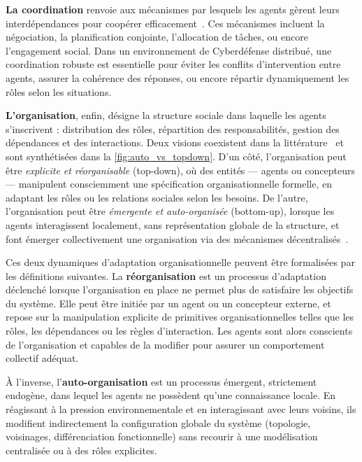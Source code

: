 \textbf{La coordination} renvoie aux mécanismes par lesquels les agents gèrent leurs interdépendances pour coopérer efficacement~\cite{Durfee2001, Jennings1996, Sandholm1999}. Ces mécanismes incluent la négociation, la planification conjointe, l'allocation de tâches, ou encore l'engagement social. Dans un environnement de Cyberdéfense distribué, une coordination robuste est essentielle pour éviter les conflits d'intervention entre agents, assurer la cohérence des réponses, ou encore répartir dynamiquement les rôles selon les situations.

\textbf{L'organisation}, enfin, désigne la structure sociale dans laquelle les agents s'inscrivent : distribution des rôles, répartition des responsabilités, gestion des dépendances et des interactions. Deux visions coexistent dans la littérature~\cite{Picard2009reorganisation} et sont synthétisées dans la \autoref{fig:auto_vs_topdown}. D'un côté, l'organisation peut être \emph{explicite et réorganisable} (top-down), où des entités — agents ou concepteurs — manipulent consciemment une spécification organisationnelle formelle, en adaptant les rôles ou les relations sociales selon les besoins. De l'autre, l'organisation peut être \emph{émergente et auto-organisée} (bottom-up), lorsque les agents interagissent localement, sans représentation globale de la structure, et font émerger collectivement une organisation via des mécanismes décentralisés~\cite{Heylighen1999, DiMarzoSerugendo2006}.

Ces deux dynamiques d'adaptation organisationnelle peuvent être formalisées par les définitions suivantes. La \textbf{réorganisation} est un processus d'adaptation déclenché lorsque l'organisation en place ne permet plus de satisfaire les objectifs du système. Elle peut être initiée par un agent ou un concepteur externe, et repose sur la manipulation explicite de primitives organisationnelles telles que les rôles, les dépendances ou les règles d'interaction. Les agents sont alors conscients de l'organisation et capables de la modifier pour assurer un comportement collectif adéquat.

À l'inverse, l'\textbf{auto-organisation} est un processus émergent, strictement endogène, dans lequel les agents ne possèdent qu'une connaissance locale. En réagissant à la pression environnementale et en interagissant avec leurs voisins, ils modifient indirectement la configuration globale du système (topologie, voisinages, différenciation fonctionnelle) sans recourir à une modélisation centralisée ou à des rôles explicites.

